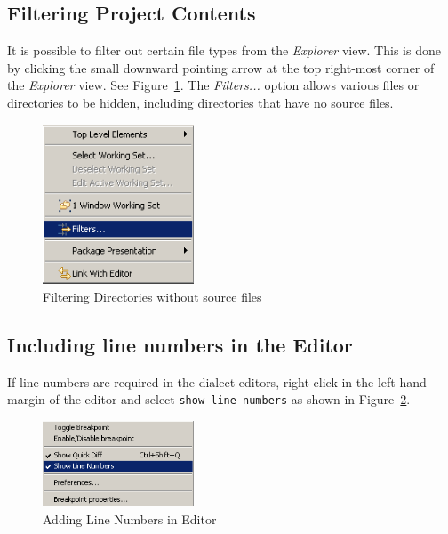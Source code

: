 \documentclass{overturerepchap}
\begin{document}
\subsection{Filtering Project Contents}

It is possible to filter out certain file types from the \emph{Explorer} view.
This is done by clicking the small downward pointing arrow at the top
right-most corner of the \emph{Explorer} view. See
Figure~\ref{fig:filteringfiles}. The \emph{Filters...} option allows
various files or directories to be hidden, including
directories that have no source files.

\begin{figure}[!htb]
\begin{center}
\includegraphics[width=0.4\textwidth]{screenDumps/filteringfiles}
\caption{Filtering Directories without source files\label{fig:filteringfiles}}
\end{center}
\end{figure}

\subsection{Including line numbers in the Editor}

If line numbers are required in the dialect
editors, right click in the left-hand margin
of the editor and select \texttt{show line numbers} as shown in
Figure~\ref{fig:linenumbers}. 

\begin{figure}[!htb]
\begin{center}
\includegraphics[width=0.4\textwidth]{screenDumps/linenumbers}
\caption{Adding Line Numbers in Editor\label{fig:linenumbers}}
\end{center}
\end{figure}
\end{document}
